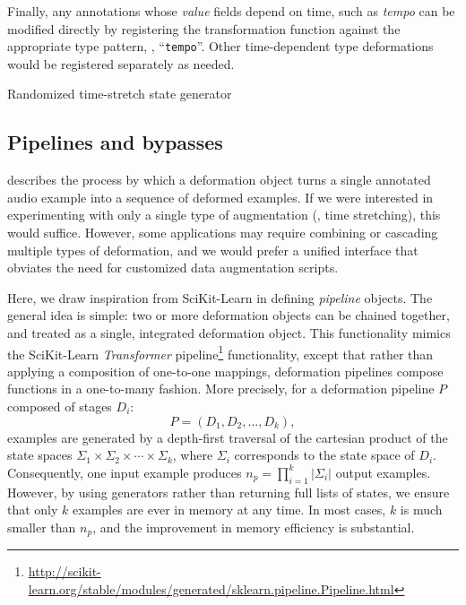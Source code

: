 \documentclass{article}
\begin{document}
Finally, any annotations whose \emph{value} fields depend on time, such as \emph{tempo}
can be modified directly by registering the transformation function against the
appropriate type pattern, \eg, ``\texttt{tempo}''.  Other time-dependent type
deformations would be registered separately as needed.

\begin{algorithm}[t]
    \caption{Randomized time-stretch state generator\label{alg:timestate}}
    \begin{algorithmic}[1]
            \EndFor{}
        \EndFunction{}
    \end{algorithmic}
\end{algorithm}

\subsection{Pipelines and bypasses}
 describes the process by which a deformation object turns a
single annotated audio example into a sequence of deformed examples.  If we were
interested in experimenting with only a single type of augmentation (\eg, time stretching), 
this would suffice.  However, some applications may require combining or cascading
multiple types of deformation, and we would prefer a unified interface that obviates the
need for customized data augmentation scripts.

Here, we draw inspiration from SciKit-Learn in defining \emph{pipeline}
objects.  The general idea is simple: two or more deformation objects can be chained
together, and treated as a single, integrated deformation object.  This functionality
mimics the SciKit-Learn \emph{Transformer} pipeline\footnote{\url{http://scikit-learn.org/stable/modules/generated/sklearn.pipeline.Pipeline.html}} functionality, except that rather
than applying a composition of one-to-one mappings, deformation pipelines
compose functions in a one-to-many fashion.  More precisely, for a deformation pipeline
$P$ composed of stages $D_i$:
\[
P = (D_1, D_2, \dots, D_k),
\]examples are generated by a depth-first traversal of the 
cartesian product of the state spaces
${\Sigma_1 \times \Sigma_2 \times \cdots \times \Sigma_k}$, where $\Sigma_i$ corresponds
to the state space of $D_i$.  Consequently, one input example produces $n_p = \prod_{i=1}^k
|\Sigma_i|$ output examples.  However, by using generators rather than returning full
lists of states, we ensure that only $k$ examples are ever in memory at any time.
In most cases, $k$ is much smaller than $n_p$, and the improvement in memory efficiency
is substantial.
\end{document}
